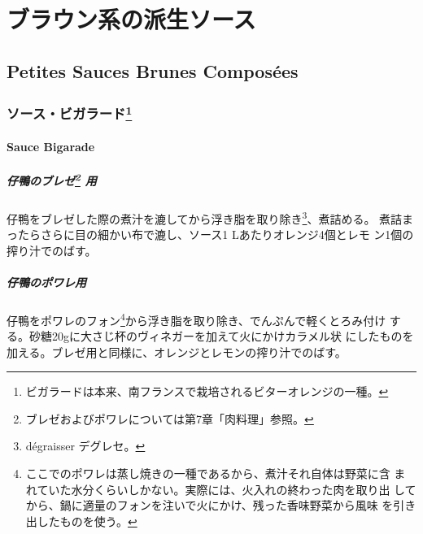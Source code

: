\hypertarget{ux30d6ux30e9ux30a6ux30f3ux7cfbux306eux6d3eux751fux30bdux30fcux30b9}{%
\section{ブラウン系の派生ソース}\label{ux30d6ux30e9ux30a6ux30f3ux7cfbux306eux6d3eux751fux30bdux30fcux30b9}}

\hypertarget{petites-sauces-brunes-composuxe9es}{%
\subsection{Petites Sauces Brunes
Composées}\label{petites-sauces-brunes-composuxe9es}}
\begin{recette}
\hypertarget{ux30bdux30fcux30b9ux30d3ux30acux30e9ux30fcux30c91}{%
\subsubsection[ソース・ビガラード]{\texorpdfstring{ソース・ビガラード\footnote{ビガラードは本来、南フランスで栽培されるビターオレンジの一種。}}{ソース・ビガラード}}\label{ux30bdux30fcux30b9ux30d3ux30acux30e9ux30fcux30c91}}

\hypertarget{sauce-bigarade}{%
\paragraph{Sauce Bigarade}\label{sauce-bigarade}}

  

\hypertarget{ux4ed4ux9d28ux306eux30d6ux30ecux30bc2-ux7528}{%
\subparagraph[仔鴨のブレゼ 用]{\texorpdfstring{仔鴨のブレゼ\footnote{ブレゼおよびポワレについては第7章「肉料理」参照。}
用}{仔鴨のブレゼ 用}}\label{ux4ed4ux9d28ux306eux30d6ux30ecux30bc2-ux7528}}

仔鴨をブレゼした際の煮汁を漉してから浮き脂を取り除き\footnote{dégraisser
  デグレセ。}、煮詰める。 煮詰まったらさらに目の細かい布で漉し、ソース1
Lあたりオレンジ4個とレモ ン1個の搾り汁でのばす。

\hypertarget{ux4ed4ux9d28ux306eux30ddux30efux30ecux7528}{%
\subparagraph{仔鴨のポワレ用}\label{ux4ed4ux9d28ux306eux30ddux30efux30ecux7528}}

仔鴨をポワレのフォン\footnote{ここでのポワレは蒸し焼きの一種であるから、煮汁それ自体は野菜に含
  まれていた水分くらいしかない。実際には、火入れの終わった肉を取り出
  してから、鍋に適量のフォンを注いで火にかけ、残った香味野菜から風味
  を引き出したものを使う。}から浮き脂を取り除き、でんぷんで軽くとろみ付け
する。砂糖20gに大さじ\undemi{}杯のヴィネガーを加えて火にかけカラメル状
にしたものを加える。ブレゼ用と同様に、オレンジとレモンの搾り汁でのばす。


\end{recette}
